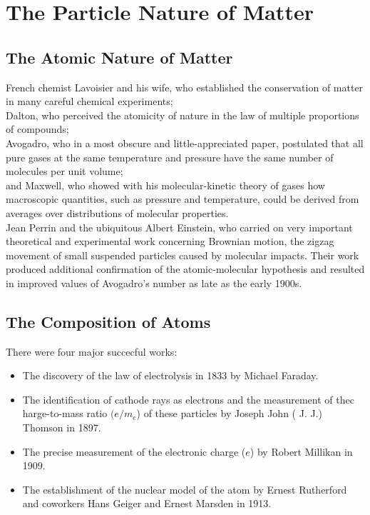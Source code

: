 \chapter{The Particle Nature of Matter}
    \section{The Atomic Nature of Matter}
        French chemist Lavoisier and his wife, who established the conservation of matter in 
        many careful chemical experiments; \\Dalton, who perceived the atomicity of nature in the law of multiple 
        proportions of compounds; \\Avogadro, who in a most obscure and little-appreciated paper, postulated that 
        all pure gases at the same temperature and pressure have the same number of molecules per unit volume; \\
        and Maxwell, who showed with his molecular-kinetic theory of gases how macroscopic quantities, such as 
        pressure and temperature, could be derived from averages over distributions of molecular properties.\\
        Jean Perrin and the ubiquitous Albert Einstein, who carried on very important theoretical and experimental 
        work concerning Brownian motion, the zigzag movement of small suspended particles caused by molecular impacts.
        Their work produced additional confirmation of the atomic-molecular hypothesis and resulted in improved values of 
        Avogadro’s number as late as the early 1900s.

    \section{The Composition of Atoms}
        There were four major succecful works:
        \begin{itemize}
            \item The discovery of the law of electrolysis in 1833 by Michael Faraday.
            \item The identification of cathode rays as electrons and the measurement of thec harge-to-mass 
            ratio $(e/m_e$) of these particles by Joseph John ( J. J.) Thomson in 1897.
            \item The precise measurement of the electronic charge ($e$) by Robert Millikan in 1909.
            \item The establishment of the nuclear model of the atom by Ernest Rutherford and coworkers Hans Geiger and 
            Ernest Marsden in 1913.
        \end{itemize}

